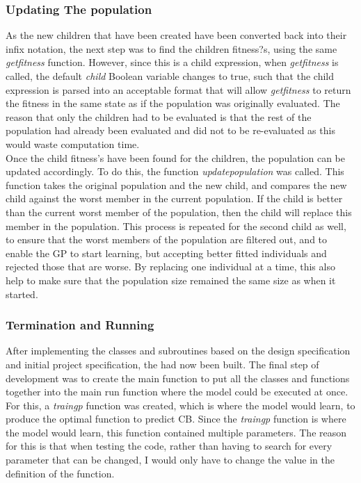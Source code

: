 \documentclass[11pt]{article}
\begin{document}
\subsubsection{Updating The population}
As the new children that have been created have been converted back into their infix notation, the next step was to find the children fitness?s, using the same \textit{get\textunderscore fitness} function. However,  since this is a child expression, when \textit{get\textunderscore fitness} is called, the default \textit{child} Boolean variable changes to true, such that the child expression is parsed into an acceptable format that will allow \textit{get\textunderscore fitness} to return the fitness in the same state as if the population was originally evaluated. The reason that only the children had to be evaluated is that the rest of the population had already been evaluated and did not to be re-evaluated as this would waste computation time.  \\

Once the child fitness's have been found for the children, the population can be updated accordingly. To do this, the function \textit{update\textunderscore population} was called. This function takes the original population and the new child, and compares the new child against the worst member in the current population. If the child is better than the current worst member of the population, then the child will replace this member in the population. This process is repeated for the second child as well, to ensure that the worst members of the population are filtered out, and to enable the GP to start learning, but accepting better fitted individuals and rejected those that are worse. By replacing one individual at a time, this also help to make sure that the population size remained the same size as when it started. 

\subsubsection{Termination and Running}
After implementing the classes and subroutines based on the design specification and initial project specification, the had now been built. The final step of development was to create the main function to put all the classes and functions together into the main run function where the model could be executed at once. For this, a \textit{train\textunderscore gp} function was created, which is where the model would learn, to produce the optimal function to predict CB. Since the \textit{train\textunderscore gp} function is where the model would learn, this function contained multiple parameters. The reason for this is that when testing the code, rather than having to search for every parameter that can be changed, I would only have to change the value in the definition of the function.
\end{document}
